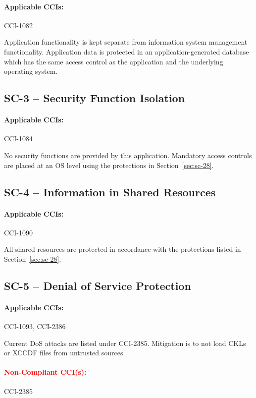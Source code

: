 \documentclass[letterpaper, 10pt, twoside]{article}
\begin{document}
\paragraph{Applicable CCIs:} CCI-1082

Application functionality is kept separate from information system management functionality. Application data is protected in an application-generated database which has the same access control as the application and the underlying operating system.

\subsection{SC-3 -- Security Function Isolation}

\paragraph{Applicable CCIs:} CCI-1084

No security functions are provided by this application. Mandatory access controls are placed at an OS level using the protections in Section~\ref{sec:sc-28}.

\subsection{SC-4 -- Information in Shared Resources}

\paragraph{Applicable CCIs:} CCI-1090

All shared resources are protected in accordance with the protections listed in Section~\ref{sec:sc-28}.

\subsection{SC-5 -- Denial of Service Protection}
\label{sec:sc-5}

\paragraph{Applicable CCIs:} CCI-1093, CCI-2386

Current DoS attacks are listed under CCI-2385. Mitigation is to not load CKLs or XCCDF files from untrusted sources.

\paragraph{\textcolor{red}{Non-Compliant CCI(s):}} CCI-2385
\end{document}
